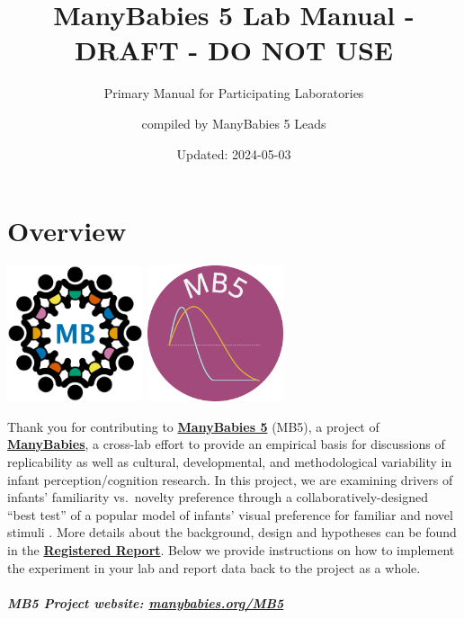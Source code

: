\documentclass[
]{book}
\title{ManyBabies 5 Lab Manual - DRAFT - DO NOT USE}
\subtitle{Primary Manual for Participating Laboratories}
\author{compiled by ManyBabies 5 Leads}
\date{Updated: 2024-05-03}
\begin{document}
\maketitle

{
\setcounter{tocdepth}{1}
\tableofcontents
}
\hypertarget{overview}{%
\chapter*{Overview}\label{overview}}

\includegraphics[width=0.3\textwidth,height=\textheight]{images/mb-logo.png} \includegraphics[width=0.3\textwidth,height=\textheight]{images/mb5-logo.png}

Thank you for contributing to \href{https://manybabies.org/MB5/}{\textbf{ManyBabies 5}} (MB5), a project of \href{https://manybabies.org/}{\textbf{ManyBabies}}, a cross-lab effort to provide an empirical basis for discussions of replicability as well as cultural, developmental, and methodological variability in infant perception/cognition research. In this project, we are examining drivers of infants' familiarity vs.~novelty preference through a collaboratively-designed ``best test'' of a popular model of infants' visual preference for familiar and novel stimuli \citep{hunterames}. More details about the background, design and hypotheses can be found in the \href{https://osf.io/preprints/psyarxiv/ck3vd}{\textbf{Registered Report}}. Below we provide instructions on how to implement the experiment in your lab and report data back to the project as a whole.

\hypertarget{mb5-project-website-manybabies.orgmb5}{%
\paragraph*{\texorpdfstring{\textbf{MB5 Project website:} \url{manybabies.org/MB5}}{MB5 Project website: manybabies.org/MB5}}\label{mb5-project-website-manybabies.orgmb5}}
\end{document}
